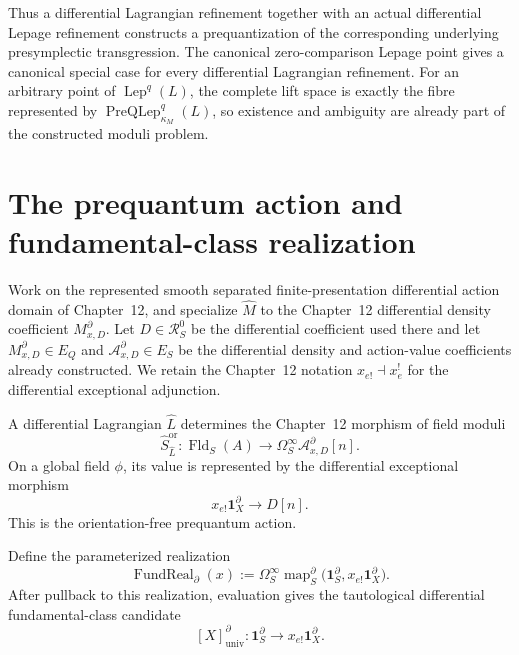 Thus a differential Lagrangian refinement together with an actual differential
Lepage refinement constructs a prequantization of the corresponding underlying
presymplectic transgression.  The canonical zero-comparison Lepage point gives a
canonical special case for every differential Lagrangian refinement.  For an
arbitrary point of $\operatorname{Lep}^{q}(L)$, the complete lift space is
exactly the fibre represented by
$\operatorname{PreQLep}_{\kappa_M}^{q}(L)$, so existence and ambiguity are
already part of the constructed moduli problem.

\section{The prequantum action and fundamental-class realization}
\label{sec:prequantum-action-functional}

Work on the represented smooth separated finite-presentation differential action
domain of Chapter~12, and specialize $\widehat M$ to the Chapter~12 differential
density coefficient $M^\partial_{x,D}$.  Let $D\in\mathcal R_S^0$ be the
differential coefficient used there and let $M^\partial_{x,D}\in E_Q$ and
$\mathcal A_{x,D}^{\partial}\in E_S$ be the differential density and action-value
coefficients already constructed.  We retain the Chapter~12 notation
$x_{e!}\dashv x_e^!$ for the differential exceptional adjunction.

\begin{construction}
\label{constr:prequantum-action}
A differential Lagrangian $\widehat L$ determines the Chapter~12 morphism of field
moduli
\[
\boxed{
\widehat S_{\widehat L}^{\mathrm{or}}:
\operatorname{Fld}_S(A)
\longrightarrow
\Omega_S^\infty\mathcal A_{x,D}^{\partial}[n].
}
\]
On a global field $\phi$, its value is represented by the differential exceptional
morphism
\[
\boxed{
x_{e!}\mathbf1_X^{\partial}
\longrightarrow
D[n].
}
\]
This is the orientation-free prequantum action.
\end{construction}

\begin{definition}
\label{def:prequantum-fundamental-class-realization}
Define the parameterized realization
\[
\boxed{
\operatorname{FundReal}_{\partial}(x)
:=
\Omega_S^\infty
\operatorname{map}^{\partial}_S
\bigl(\mathbf1_S^{\partial},x_{e!}\mathbf1_X^{\partial}\bigr).
}
\]
After pullback to this realization, evaluation gives the tautological differential
fundamental-class candidate
\[
[X]^\partial_{\mathrm{univ}}:
\mathbf1_S^{\partial}
\longrightarrow
x_{e!}\mathbf1_X^{\partial}.
\]
\end{definition}


